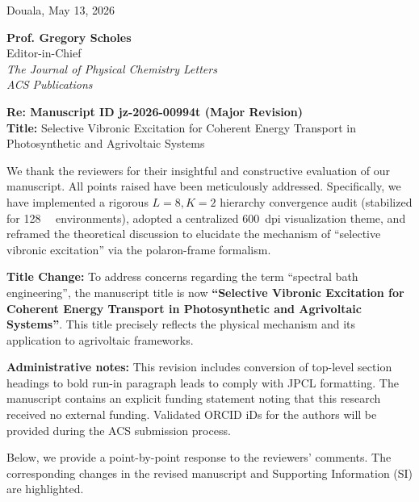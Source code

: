 \documentclass[11pt]{article}
\begin{document}
\begin{flushright}
    Douala, May 13, 2026
\end{flushright}

\noindent \textbf{Prof. Gregory Scholes}\\
Editor-in-Chief\\
\textit{The Journal of Physical Chemistry Letters}\\
\textit{ACS Publications}

\vspace{1em}

\noindent \textbf{Re: Manuscript ID jz-2026-00994t (Major Revision)}\\
\textbf{Title:} Selective Vibronic Excitation for Coherent Energy Transport in Photosynthetic and Agrivoltaic Systems

\vspace{2em}

\noindent We thank the reviewers for their insightful and constructive evaluation of our manuscript. All points raised have been meticulously addressed. Specifically, we have implemented a rigorous $L=8, K=2$ hierarchy convergence audit (stabilized for \SI{128}{\giga\byte} environments), adopted a centralized \SI{600}{dpi} visualization theme, and reframed the theoretical discussion to elucidate the mechanism of ``selective vibronic excitation'' via the polaron-frame formalism. 

\noindent \textbf{Title Change:} To address concerns regarding the term ``spectral bath engineering'', the manuscript title is now \textbf{``Selective Vibronic Excitation for Coherent Energy Transport in Photosynthetic and Agrivoltaic Systems''}. This title precisely reflects the physical mechanism and its application to agrivoltaic frameworks.

\vspace{1em}
\noindent\textbf{Administrative notes:} This revision includes conversion of top-level section headings to bold run-in paragraph leads to comply with JPCL formatting. The manuscript contains an explicit funding statement noting that this research received no external funding. Validated ORCID iDs for the authors will be provided during the ACS submission process.

Below, we provide a point-by-point response to the reviewers' comments. The corresponding changes in the revised manuscript and Supporting Information (SI) are highlighted.

\vspace{2em}
\end{document}
